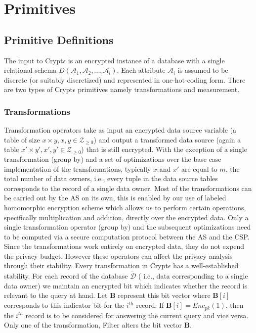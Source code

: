 \section{Primitives}
\subsection{Primitive Definitions} 
The input to Crypt$\epsilon$ is an encrypted instance of a database with a single relational schema $D(\mathcal{A}_1,\mathcal{A}_2, . . . ,\mathcal{A}_l)$. Each attribute $\mathcal{A}_i$ is assumed to be discrete
(or suitably discretized) and represented in one-hot-coding form. 
There are two types of Crypt$\epsilon$ primitives namely transformations and measurement.
\subsubsection{\textbf{Transformations}}
 Transformation operators take
as input an encrypted data source variable (a table of size $x \times y, x,y \in \mathcal{Z}_{\geq 0}$) and output
a transformed data source (again  a table $x' \times y', x',y' \in \mathcal{Z}_{\geq 0}$) that is still encrypted. With the exception of a single transformation (group by) and a set of optimizations over the base case implementation of the transformations, typically $x$ and $x'$ are equal to $m$, the total number of data owners, i.e., every tuple in the data source tables corresponds to the record of a single data owner. Most of the transformations can be carried out by the AS on its own, this is enabled by our use of labeled homomorphic encryption scheme which allows us to perform certain operations, specifically multiplication and addition, directly over the encrypted data. Only a single transformation operator (group by) and the subsequent optimizations need to be computed via a secure computation protocol between the AS and the CSP. Since the transformations work entirely on encrypted data, they do not expend the privacy budget. However these operators can affect the privacy analysis through their stability. 
Every transformation in Crypt$\epsilon$ has a well-established stability.
For each record of the database $\boldsymbol{\tilde{\mathcal{D}}}$ ( i.e., data corresponding to a single data owner) we maintain an encrypted bit which indicates whether the record is relevant to the query at hand. Let $\mathbf{B}$ represent this bit vector where $\mathbf{B}[i]$ corresponds to this indicator bit for the $i^{th}$ record.  If $\mathbf{B}[i] =Enc_{pk}(1)$, then the $i^{th}$ record is to be considered for answering the current query and vice versa. Only one of the transformation, Filter alters the bit vector $\mathbf{B}$.
